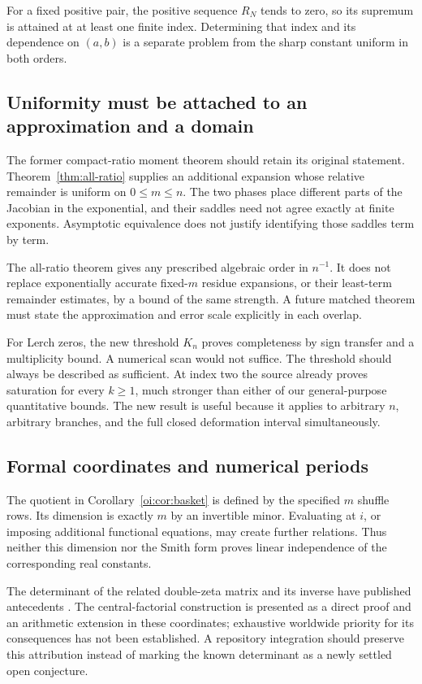 For a fixed positive pair, the positive sequence $R_N$ tends to zero,
so its supremum is attained at at least one finite index. Determining
that index and its dependence on $(a,b)$ is a separate problem from
the sharp constant uniform in both orders.

\subsection{Uniformity must be attached to an approximation and a domain}

The former compact-ratio moment theorem should retain its original
statement. Theorem~\ref{thm:all-ratio} supplies an additional expansion
whose relative remainder is uniform on $0\le m\le n$. The two phases
place different parts of the Jacobian in the exponential, and their
saddles need not agree exactly at finite exponents. Asymptotic
equivalence does not justify identifying those saddles term by term.

The all-ratio theorem gives any prescribed algebraic order in $n^{-1}$.
It does not replace exponentially accurate fixed-$m$ residue expansions,
or their least-term remainder estimates, by a bound of the same strength.
A future matched theorem must state the approximation and error scale
explicitly in each overlap.

For Lerch zeros, the new threshold $K_n$ proves completeness by sign
transfer and a multiplicity bound. A numerical scan would not suffice.
The threshold should always be described as sufficient. At index two
the source already proves saturation for every $k\ge1$, much stronger
than either of our general-purpose quantitative bounds. The new result
is useful because it applies to arbitrary $n$, arbitrary branches, and
the full closed deformation interval simultaneously.

\subsection{Formal coordinates and numerical periods}

The quotient in Corollary~\ref{oi:cor:basket} is defined by the
specified $m$ shuffle rows. Its dimension is exactly $m$ by an invertible
minor. Evaluating at $i$, or imposing additional functional equations,
may create further relations. Thus neither this dimension nor the Smith
form proves linear independence of the corresponding real constants.

The determinant of the related double-zeta matrix and its inverse have
published antecedents \cite{Zagier,Ma,MaTeo}. The central-factorial
construction is presented as a direct proof and an arithmetic extension
in these coordinates; exhaustive worldwide priority for its consequences
has not been established. A repository integration should preserve this
attribution instead of marking the known determinant as a newly settled
open conjecture.

